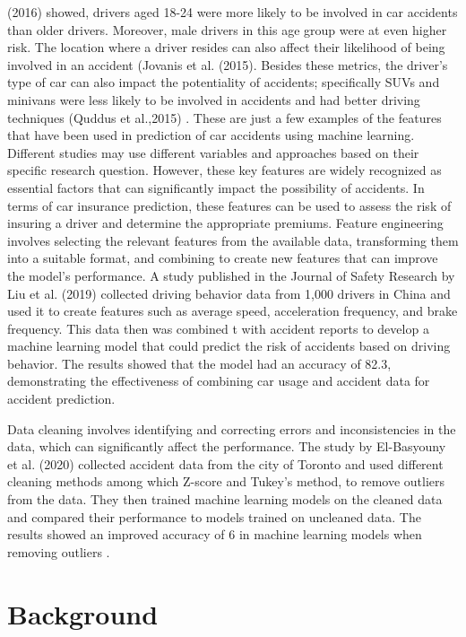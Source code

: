 \documentclass{IEEEtran}
\begin{document}
(2016) showed, drivers aged 18-24 were more likely to be involved in car accidents than older drivers. Moreover, male drivers in this age group were at even higher risk. The location where a driver resides can also affect their likelihood of being involved in an accident (Jovanis et al. (2015). Besides these metrics, the driver's type of car can also impact the potentiality of accidents; specifically SUVs and minivans were less likely to be involved in accidents and had better driving techniques (Quddus et al.,2015) . These are just a few examples of the features that have been used in prediction of car accidents using machine learning. Different studies may use different variables and approaches based on their specific research question. However, these key features are widely recognized as essential factors that can significantly impact the possibility of accidents. In terms of car insurance prediction, these features can be used to assess the risk of insuring a driver and determine the appropriate premiums.
Feature engineering involves selecting the relevant features from the available data, transforming them into a suitable format, and combining to create new features that can improve the model's performance. A study published in the Journal of Safety Research by Liu et al. (2019)  collected driving behavior data from 1,000 drivers in China and used it to create features such as average speed, acceleration frequency, and brake frequency. This data then was combined t with accident reports to develop a machine learning model that could predict the risk of accidents based on driving behavior. The results showed that the model had an accuracy of 82.3\text{\%}, demonstrating the effectiveness of combining car usage and accident data for accident prediction. 

Data cleaning involves identifying and correcting errors and inconsistencies in the data, which can significantly affect the performance. The study by El-Basyouny et al. (2020) collected accident data from the city of Toronto and used different cleaning methods among which  Z-score and Tukey's method, to remove outliers from the data. They then trained machine learning models on the cleaned data and compared their performance to models trained on uncleaned data. The results showed an improved accuracy of 6\text{\%} in machine learning models when removing outliers .

\section{Background }
\end{document}

